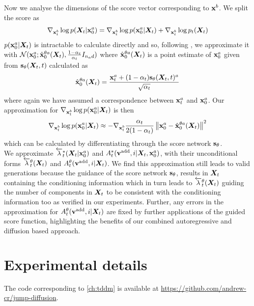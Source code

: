 Now we analyse the dimensions of the score vector corresponding to ${\mathbf{x}}^b$. We split the score as
\begin{equation}
    \nabla_{{\mathbf{x}}_t^b} \log p({\bm{X}}_t | {\mathbf{x}}_0^a) = \nabla_{{\mathbf{x}}_t^b} \log p({\mathbf{x}}_0^a | {\bm{X}}_t) + \nabla_{{\mathbf{x}}_t^b} \log p_t({\bm{X}}_t)
    \label{eq:condScoreSplit}
\end{equation}
$p({\mathbf{x}}_0^a | {\bm{X}}_t)$ is intractable to calculate directly and so, following \citet{ho2022video}, we approximate it with $\mathcal{N}({\mathbf{x}}_0^a ; \hat{{\mathbf{x}}}_0^{\theta a}({\bm{X}}_t), \frac{1 - \alpha_t}{\alpha_t} I_{n_a d})$ where $\hat{{\mathbf{x}}}_0^{\theta a}({\bm{X}}_t)$ is a point estimate of ${\mathbf{x}}_0^a$ given from ${\mathbf{s}}_\theta({\bm{X}}_t, t)$ calculated as 
\begin{equation}
    \hat{{\mathbf{x}}}_0^{\theta a}({\bm{X}}_t) = \frac{{\mathbf{x}}_t^a + (1 - \alpha_t) {\mathbf{s}}_\theta({\bm{X}}_t, t)^a}{\sqrt{\alpha_t}}
\end{equation}
where again we have assumed a correspondence between ${\mathbf{x}}_t^a$ and ${\mathbf{x}}_0^a$. Our approximation for $\nabla_{{\mathbf{x}}_t^b} \log p({\mathbf{x}}_0^a | {\bm{X}}_t)$ is then
\begin{equation}
    \nabla_{{\mathbf{x}}_t^b} \log p({\mathbf{x}}_0^a | {\bm{X}}_t) \approx - \nabla_{{\mathbf{x}}_t^b} \frac{\alpha_t}{2 ( 1- \alpha_t)} \left\lVert{\mathbf{x}}_0^a - \hat{{\mathbf{x}}}_0^{\theta a}({\bm{X}}_t) \right\rVert^2
\end{equation}
which can be calculated by differentiating through the score network ${\mathbf{s}}_\theta$. \\

We approximate $\overleftarrow{\lambda}_t^*({\bm{X}}_t | {\mathbf{x}}_0^a)$ and $A_t^*({\mathbf{v}}^{\textup{add}}, i | {\bm{X}}_t, {\mathbf{x}}_0^a)$, with their unconditional forms $\overleftarrow{\lambda}_t^\theta({\bm{X}}_t)$ and $A_t^\theta({\mathbf{v}}^{\textup{add}}, i | {\bm{X}}_t)$. We find this approximation still leads to valid generations because the guidance of the score network ${\mathbf{s}}_\theta$, results in ${\bm{X}}_t$ containing the conditioning information which in turn leads to $\overleftarrow{\lambda}_t^\theta({\bm{X}}_t)$ guiding the number of components in ${\bm{X}}_t$ to be consistent with the conditioning information too as verified in our experiments. Further, any errors in the approximation for $A_t^\theta({\mathbf{v}}^{\textup{add}}, i | {\bm{X}}_t)$ are fixed by further applications of the guided score function, highlighting the benefits of our combined autoregressive and diffusion based approach.





\section{Experimental details}
\label{sec:tddm-ExperimentDetails}
The code corresponding to \cref{ch:tddm} is available at \url{https://github.com/andrew-cr/jump-diffusion}.

